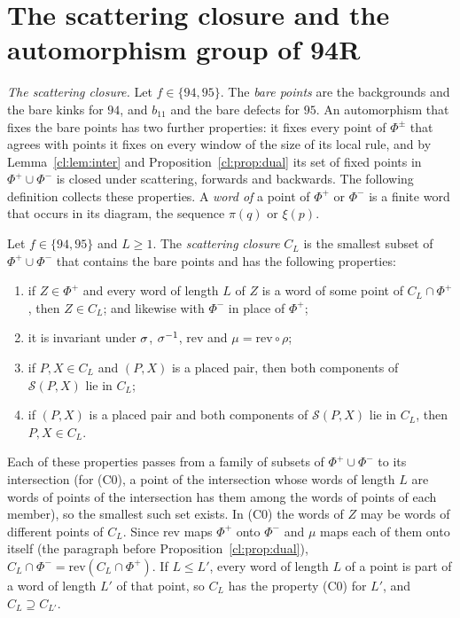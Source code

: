 \section{The scattering closure and the automorphism group of 94R}\label{cl:sec:94}

\emph{The scattering closure.} Let $f\in\{94,95\}$. The \emph{bare points} are the backgrounds and the bare kinks for $94$, and $b_{11}$ and the bare defects for $95$. An automorphism that fixes the bare points has two further properties: it fixes every point of $\Phi^\pm$ that agrees with points it fixes on every window of the size of its local rule, and by Lemma~\ref{cl:lem:inter} and Proposition~\ref{cl:prop:dual} its set of fixed points in $\Phi^+\cup\Phi^-$ is closed under scattering, forwards and backwards. The following definition collects these properties. A \emph{word of} a point of $\Phi^+$ or $\Phi^-$ is a finite word that occurs in its diagram, the sequence $\pi(q)$ or $\xi(p)$.

\begin{definition}\label{cl:def:CL}
Let $f\in\{94,95\}$ and $L\ge1$. The \emph{scattering closure} $C_L$ is the smallest subset of $\Phi^+\cup\Phi^-$ that contains the bare points and has the following properties:
\begin{enumerate}
\item[(C0)] if $Z\in\Phi^+$ and every word of length $L$ of $Z$ is a word of some point of $C_L\cap\Phi^+$, then $Z\in C_L$; and likewise with $\Phi^-$ in place of $\Phi^+$;
\item[(C1)] it is invariant under $\sigma$, $\sigma^{-1}$, $\mathrm{rev}$ and $\mu=\mathrm{rev}\circ\rho$;
\item[(C2)] if $P,X\in C_L$ and $(P,X)$ is a placed pair, then both components of $\mathcal S(P,X)$ lie in $C_L$;
\item[(C3)] if $(P,X)$ is a placed pair and both components of $\mathcal S(P,X)$ lie in $C_L$, then $P,X\in C_L$.
\end{enumerate}
\end{definition}

Each of these properties passes from a family of subsets of $\Phi^+\cup\Phi^-$ to its intersection (for (C0), a point of the intersection whose words of length $L$ are words of points of the intersection has them among the words of points of each member), so the smallest such set exists. In (C0) the words of $Z$ may be words of different points of $C_L$. Since $\mathrm{rev}$ maps $\Phi^+$ onto $\Phi^-$ and $\mu$ maps each of them onto itself (the paragraph before Proposition~\ref{cl:prop:dual}), $C_L\cap\Phi^-=\mathrm{rev}(C_L\cap\Phi^+)$. If $L\le L'$, every word of length $L$ of a point is part of a word of length $L'$ of that point, so $C_L$ has the property (C0) for $L'$, and $C_L\supseteq C_{L'}$.

